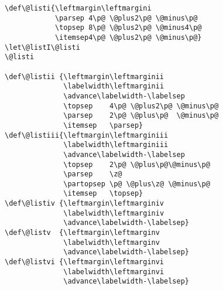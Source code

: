 \bigskip
{}

\begin{tcolorbox}[title=Extract from bk10.clo]
\begin{lstlisting}
\def\@listi{\leftmargin\leftmargini
            \parsep 4\p@ \@plus2\p@ \@minus\p@
            \topsep 8\p@ \@plus2\p@ \@minus4\p@
            \itemsep4\p@ \@plus2\p@ \@minus\p@}
\let\@listI\@listi
\@listi

\def\@listii {\leftmargin\leftmarginii
              \labelwidth\leftmarginii
              \advance\labelwidth-\labelsep
              \topsep    4\p@ \@plus2\p@ \@minus\p@
              \parsep    2\p@ \@plus\p@  \@minus\p@
              \itemsep   \parsep}
\def\@listiii{\leftmargin\leftmarginiii
              \labelwidth\leftmarginiii
              \advance\labelwidth-\labelsep
              \topsep    2\p@ \@plus\p@\@minus\p@
              \parsep    \z@
              \partopsep \p@ \@plus\z@ \@minus\p@
              \itemsep   \topsep}
\def\@listiv {\leftmargin\leftmarginiv
              \labelwidth\leftmarginiv
              \advance\labelwidth-\labelsep}
\def\@listv  {\leftmargin\leftmarginv
              \labelwidth\leftmarginv
              \advance\labelwidth-\labelsep}
\def\@listvi {\leftmargin\leftmarginvi
              \labelwidth\leftmarginvi
              \advance\labelwidth-\labelsep}
\end{lstlisting}
\end{tcolorbox}


